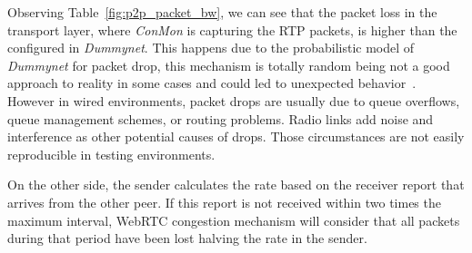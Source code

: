 
Observing Table~\ref{fig:p2p_packet_bw}, we can see that the packet loss in the transport layer, where {\it ConMon} is capturing the RTP packets, is higher than the configured in {\it Dummynet}. This happens due to the probabilistic model of {\it Dummynet} for packet drop, this mechanism is totally random being not a good approach to reality in some cases and could led to unexpected behavior~\cite{dummynetRevisited}. However in wired environments, packet drops are usually due to queue overflows, queue management schemes, or routing problems. Radio links add noise and interference as other potential causes of drops.  Those circumstances are not easily reproducible in testing environments.


On the other side, the sender calculates the rate based on the receiver report that arrives from the other peer. If this report is not received within two times the maximum interval, WebRTC congestion mechanism will consider that all packets during that period have been lost halving the rate in the sender. 

